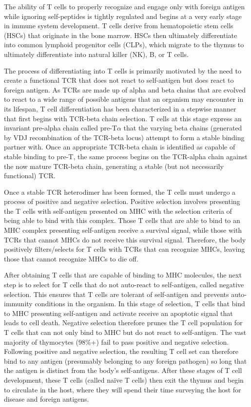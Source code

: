 The ability of T cells to properly recognize and engage only with foreign antigen while ignoring self-peptides is tightly regulated and begins at a very early stage in immune system development. T cells derive from hematopoietic stem cells (HSCs) that originate in the bone marrow. HSCs then ultimately differentiate into common lymphoid progenitor cells (CLPs), which migrate to the thymus to ultimately differentiate into natural killer (NK), B, or T cells. 

The process of differentiating into T cells is primarily motivated by the need to create a functional TCR that does not react to self-antigen but does react to foreign antigen. As TCRs are made up of alpha and beta chains that are evolved to react to a wide range of possible antigens that an organism may encounter in its lifespan, T cell differentiation has been characterized in a stepwise manner that first begins with TCR-beta chain selection. T cells at this stage express an invariant pre-alpha chain called pre-T$\alpha$ that the varying beta chains (generated by VDJ recombination of the TCR-beta locus) attempt to form a stable binding partner with. Once an appropriate TCR-beta chain is identified as capable of stable binding to pre-T, the same process begins on the TCR-alpha chain against the now mature TCR-beta chain, generating a stable (but not necessarily functional) TCR.

Once a stable TCR heterodimer has been formed, the T cells must undergo a process of positive and negative selection. Positive selection involves presenting the T cells with self-antigen presented on MHC with the selection criteria of being able to bind with this complex. Those T cells that are able to bind to an MHC complex presenting self-antigen receive a survival signal, while those with TCRs that cannot MHCs do not receive this survival signal. Therefore, the body positively filters/selects for T cells with TCRs that can recognize MHCs, leaving those that cannot recognize MHCs to die off. 

After obtaining T cells that are capable of binding to MHC molecules, the next step is to select for T cells that do not auto-react to self-antigen, called negative selection. This ensures that T cells are tolerant of self-antigen and prevents auto-immunity conditions in the organism. In this stage of selection, T cells that bind to MHC presenting self-antigen and activate receive an apoptotic signal that leads to cell death. Negative selection therefore prunes the T cell population for T cells that can not only bind to MHC but do not react to self-antigen. The vast majority of thymocytes (98\%+) fail to pass positive and negative selection. Following positive and negative selection, the resulting T cell set can therefore bind to any antigen (presumably belonging to any foreign pathogen) so long that the antigen is distinct from the body’s self-antigens. 
After these stages of T cell development, these T cells (called naïve T cells) then exit the thymus and begin to circulate in the host, where they will spend their time surveying the host for disease and foreign antigens.

